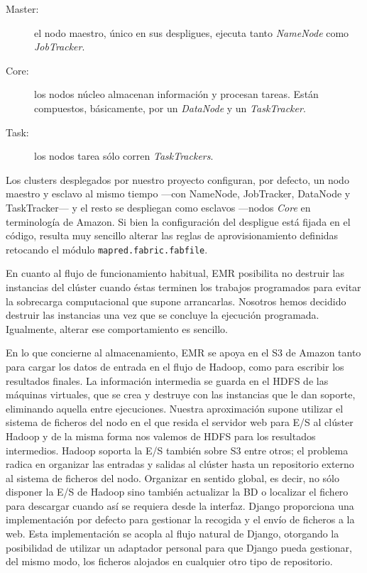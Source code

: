 \begin{description}
 \item[Master:] el nodo maestro, \'unico en sus despligues, ejecuta tanto \emph{NameNode} como \emph{JobTracker}.
 \item[Core:] los nodos n\'ucleo almacenan informaci\'on y procesan tareas. Est\'an compuestos, b\'asicamente, por un \emph{DataNode} y un \emph{TaskTracker}.
 \item[Task:] los nodos tarea s\'olo corren \emph{TaskTrackers}.
\end{description}

Los clusters desplegados por nuestro proyecto configuran, por defecto, un nodo maestro y esclavo al mismo tiempo ---con NameNode, JobTracker, DataNode y TaskTracker--- y el resto se despliegan como esclavos ---nodos \emph{Core} en terminolog\'ia de Amazon. Si bien la configuraci\'on del despligue est\'a fijada en el c\'odigo, resulta muy sencillo alterar las reglas de aprovisionamiento definidas retocando el m\'odulo \texttt{mapred.fabric.fabfile}.\newline

En cuanto al flujo de funcionamiento habitual, EMR posibilita no des\-truir las instancias del cl\'uster cuando \'estas terminen los trabajos programados para evitar la sobrecarga computacional que supone arrancarlas. Nosotros hemos decidido destruir las instancias una vez que se concluye la ejecuci\'on programada. Igualmente, alterar ese comportamiento es sencillo.\newline

En lo que concierne al almacenamiento, EMR se apoya en el S3 de Amazon tanto para cargar los datos de entrada en el flujo de Hadoop, como para escribir los resultados finales. La informaci\'on intermedia se guarda en el HDFS de las m\'aquinas virtuales, que se crea y destruye con las instancias que le dan soporte, eliminando aquella entre ejecuciones. Nuestra aproximaci\'on supone utilizar el sistema de ficheros del nodo en el que resida el servidor web para E/S al cl\'uster Hadoop y de la misma forma nos valemos de HDFS para los resultados intermedios. Hadoop soporta la E/S tambi\'en sobre S3 entre otros; el problema radica en organizar las entradas y salidas al cl\'uster hasta un repositorio externo al sistema de ficheros del nodo. Organizar en sentido global, es decir, no s\'olo disponer la E/S de Hadoop sino tambi\'en actualizar la BD o localizar el fichero para descargar cuando as\'i se requiera desde la interfaz. Django proporciona una implementaci\'on por defecto para gestionar la recogida y el env\'io de ficheros a la web. Esta implementaci\'on se acopla al flujo natural de Django, otorgando la posibilidad de utilizar un adaptador personal para que Django pueda gestionar, del mismo modo, los ficheros alojados en cualquier otro tipo de repositorio.


